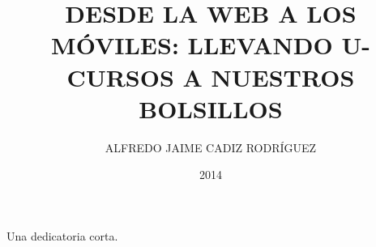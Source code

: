 \documentclass[upright, contnum]{umemoria}
\author{ALFREDO JAIME CADIZ RODRÍGUEZ}
\title{DESDE LA WEB A LOS MÓVILES: LLEVANDO U-CURSOS A NUESTROS BOLSILLOS}
\date{2014}
\begin{document}
\frontmatter
\maketitle

\begin{abstract}
\lipsum[1-4]
\end{abstract}

\begin{dedicatoria}
Una dedicatoria corta.
\end{dedicatoria}

\begin{thanks}
\lipsum[1-2]
\end{thanks}

\cleardoublepage
\tableofcontents
\cleardoublepage
\listoftables
\cleardoublepage
\listoffigures

\mainmatter






\nocite{*}


\end{document}
